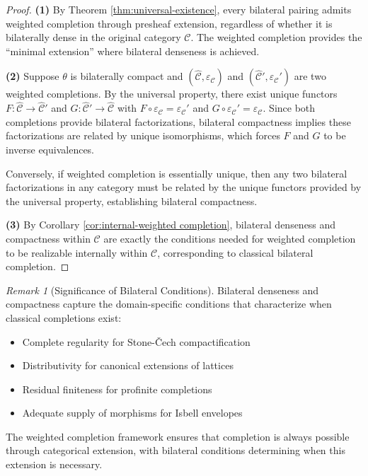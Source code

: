 \documentclass[11pt]{article}
\theoremstyle{plain}
\theoremstyle{definition}
\theoremstyle{remark}
\newtheorem{remark}[theorem]{Remark}
\newcommand{\C}{\mathcal{C}}
\newcommand{\wh}[1]{\widehat{#1}}
\begin{document}
\begin{proof}
\textbf{(1)} By Theorem \ref{thm:universal-existence}, every bilateral pairing admits weighted completion through presheaf extension, regardless of whether it is bilaterally dense in the original category $\C$. The weighted completion provides the ``minimal extension'' where bilateral denseness is achieved.

\textbf{(2)} Suppose $\theta$ is bilaterally compact and $(\wh{\C}, \varepsilon_\C)$ and $(\wh{\C}', \varepsilon_\C')$ are two weighted completions. By the universal property, there exist unique functors $F : \wh{\C} \to \wh{\C}'$ and $G : \wh{\C}' \to \wh{\C}$ with $F \circ \varepsilon_\C = \varepsilon_\C'$ and $G \circ \varepsilon_\C' = \varepsilon_\C$. Since both completions provide bilateral factorizations, bilateral compactness implies these factorizations are related by unique isomorphisms, which forces $F$ and $G$ to be inverse equivalences.

Conversely, if weighted completion is essentially unique, then any two bilateral factorizations in any category must be related by the unique functors provided by the universal property, establishing bilateral compactness.

\textbf{(3)} By Corollary \ref{cor:internal-weighted completion}, bilateral denseness and compactness within $\C$ are exactly the conditions needed for weighted completion to be realizable internally within $\C$, corresponding to classical bilateral completion.
\end{proof}

\begin{remark}[Significance of Bilateral Conditions]
Bilateral denseness and compactness capture the domain-specific conditions that characterize when classical completions exist:
\begin{itemize}
\item Complete regularity for Stone-\v{C}ech compactification
\item Distributivity for canonical extensions of lattices \cite{gehrke2001bounded}
\item Residual finiteness for profinite completions
\item Adequate supply of morphisms for Isbell envelopes \cite{garner2018isbell}
\end{itemize}
The weighted completion framework ensures that completion is always possible through categorical extension, with bilateral conditions determining when this extension is necessary.
\end{remark}
\end{document}
